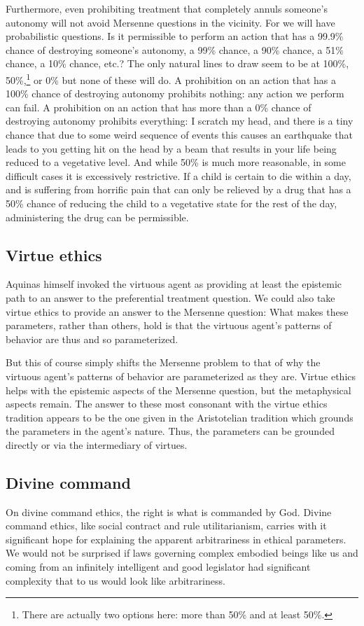 Furthermore, even prohibiting treatment that completely annuls someone's autonomy will
not avoid Mersenne questions in the vicinity. For we will have probabilistic questions. Is it permissible to perform an action that
has a 99.9\% chance of destroying someone's autonomy, a 99\% chance, a 90\% chance, a 51\% chance, a 10\% chance, etc.? The only natural
lines to draw seem to be at 100\%, 50\%,\footnote{There are actually two options here: more than 50\% and at least
50\%.} or 0\% but none of these will do. A prohibition on an action that has a 100\% chance of destroying
autonomy prohibits nothing: any action we perform can fail. A prohibition on an action that has more than a 0\% chance of destroying autonomy
prohibits everything: I scratch my head, and there is a tiny chance that due to some weird sequence of events this causes an earthquake
that leads to you getting hit on the head by a beam that results in your life being reduced to a vegetative level. And while 50\% is 
much more reasonable, in some difficult cases it is excessively restrictive. If a child is certain to die within a day, and is suffering
from horrific pain that can only be relieved by a drug that has a 50\% chance of reducing the child to a vegetative state for the rest
of the day, administering the drug can be permissible.

\subsection{Virtue ethics}
Aquinas himself invoked the virtuous agent as providing at least the epistemic path to an answer to the preferential treatment
question. We could also take virtue ethics to provide an answer to the Mersenne question: What makes these parameters, rather
than others, hold is that the virtuous agent's patterns of behavior are thus and so parameterized.

But this of course simply shifts the Mersenne problem to that of why the virtuous agent's patterns of behavior are parameterized as
they are. 
Virtue ethics helps with the epistemic aspects of the Mersenne question, but the metaphysical aspects remain.
The answer to these most consonant with the virtue ethics tradition appears to be the one given in the Aristotelian tradition which grounds the parameters in
the agent's nature. Thus, the parameters can be grounded directly or via the intermediary of virtues.

\subsection{Divine command}
On divine command ethics, the right is what is commanded by God.
Divine command ethics, like social contract and rule utilitarianism, carries with it significant hope for explaining the apparent
arbitrariness in ethical parameters. We would not be surprised if laws governing complex embodied beings
like us and coming from an infinitely intelligent and good legislator 
had significant complexity that to us would look like arbitrariness. 

